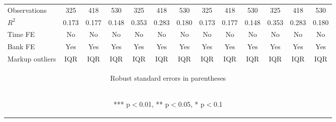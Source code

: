 \documentclass[]{article}
\begin{document}
\begin{center}
\begin{tabular}{lcccccccccccc}
Observations & 325 & 418 & 530 & 325 & 418 & 530 & 325 & 418 & 530 & 325 & 418 & 530 \\
$R^2$ & 0.173 & 0.177 & 0.148 & 0.353 & 0.283 & 0.180 & 0.173 & 0.177 & 0.148 & 0.353 & 0.283 & 0.180 \\
Time FE & No & No & No & No & No & No & No & No & No & No & No & No \\
Bank FE & Yes & Yes & Yes & Yes & Yes & Yes & Yes & Yes & Yes & Yes & Yes & Yes \\
 Markup outliers & IQR & IQR & IQR & IQR & IQR & IQR & IQR & IQR & IQR & IQR & IQR & IQR \\ \hline
\multicolumn{13}{c}{\begin{footnotesize} Robust standard errors in parentheses\end{footnotesize}} \\
\multicolumn{13}{c}{\begin{footnotesize} *** p$<$0.01, ** p$<$0.05, * p$<$0.1\end{footnotesize}} \\
\end{tabular}
\end{center}
\end{document}
